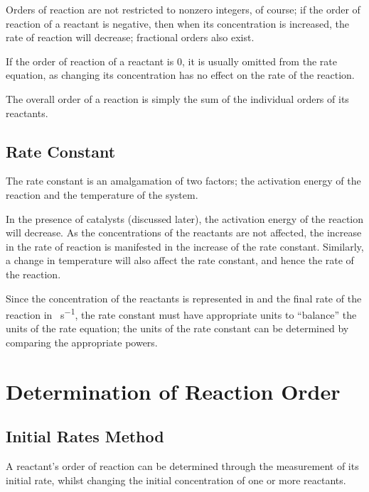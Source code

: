 			Orders of reaction are not restricted to nonzero integers, of course; if the order of reaction of a reactant is negative, then when
			its concentration is increased, the rate of reaction will decrease; fractional orders also exist.

			If the order of reaction of a reactant is 0, it is usually omitted from the rate equation, as changing its concentration has no
			effect on the rate of the reaction.

			The overall order of a reaction is simply the sum of the individual orders of its reactants.




		\subsection{Rate Constant}

			The rate constant  is an amalgamation of two factors; the activation energy of the reaction and the temperature
			of the system.

			In the presence of catalysts (discussed later), the activation energy of the reaction will decrease. As the concentrations of the
			reactants are not affected, the increase in the rate of reaction is manifested in the increase of the rate constant. Similarly, a
			change in temperature will also affect the rate constant, and hence the rate of the reaction.

			Since the concentration of the reactants is represented in \si{\molarConc} and the final rate of the reaction in \si{\molarConc\per\second},
			the rate constant must have appropriate units to ``balance'' the units of the rate equation; the units of the rate constant
			can be determined by comparing the appropriate powers.







	\section{Determination of Reaction Order}

		\subsection{Initial Rates Method}

			A reactant’s order of reaction can be determined through the measurement of its initial rate, whilst changing the initial
			concentration of one or more reactants.

